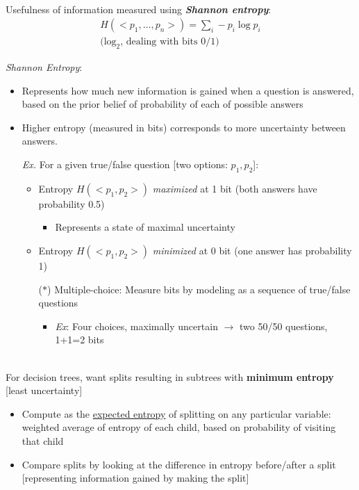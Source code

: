 \documentclass[12pt]{extarticle}
\theoremstyle{definition}
\theoremstyle{remark}
\newcommand{\pstart}[0]{\noindent}
\newcommand{\newp}[0]{~\\ \pstart}
\newcommand{\term}[1]{\noindent\textbf{\textit{#1}}}
\begin{document}
\newp
Usefulness of information measured using \term{Shannon entropy}: \begin{align*}
    H(<p_1,\hdots,p_n>)=\sum_i-p_i\log p_i\\
    \text{($\log_2$, dealing with bits 0/1)}
\end{align*}

\pstart
\textit{Shannon Entropy}: \begin{itemize}
    \item Represents how much new information is gained when a question is answered, based on the prior belief of probability of each of possible answers
    \item Higher entropy (measured in bits) corresponds to more uncertainty between answers. 
    
    \textit{Ex.} For a given true/false question [two options: $p_1,p_2$]: \begin{itemize}
        \item Entropy $H(<p_1,p_2>)$ \textit{maximized} at 1 bit (both answers have probability 0.5) \begin{itemize}
            \item Represents a state of maximal uncertainty
        \end{itemize}
        \item Entropy $H(<p_1,p_2>)$ \textit{minimized} at 0 bit (one answer has probability 1)
        \item[($\ast$)] Multiple-choice: Measure bits by modeling as a sequence of true/false questions \begin{itemize}
            \item \textit{Ex}: Four choices, maximally uncertain $\to$ two 50/50 questions, 1+1=2 bits
        \end{itemize}
    \end{itemize}
\end{itemize}

\newp
For decision trees, want splits resulting in subtrees with \textbf{minimum entropy} [least uncertainty] \begin{itemize}
    \item Compute as the \ul{expected entropy} of splitting on any particular variable: weighted average of entropy of each child, based on probability of visiting that child
    \item Compare splits by looking at the difference in entropy before/after a split [representing information gained by making the split]
\end{itemize}
\end{document}
